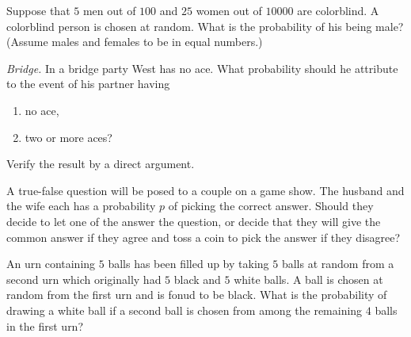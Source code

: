 \begin{problem}[Handout 4, \# 9]
  Suppose that \(5\) men out of \(100\) and \(25\) women out of
  \(\num{10000}\) are colorblind. A colorblind person is chosen at
  random. What is the probability of his being male? (Assume males and
  females to be in equal numbers.)
\end{problem}
\begin{solution}

\end{solution}
\newpage

\begin{problem}[Handout 4, \# 10]
  \emph{Bridge.} In a bridge party West has no ace. What probability should
  he attribute to the event of his partner having
  \begin{enumerate}[label=(\alph*),noitemsep]
  \item no ace,
  \item two or more aces?
  \end{enumerate}
  Verify the result by a direct argument.
\end{problem}
\begin{solution}

\end{solution}
\newpage

\begin{problem}[Handout 4, \# 12]
  A true-false question will be posed to a couple on a game show. The
  husband and the wife each has a probability \(p\) of picking the correct
  answer. Should they decide to let one of the answer the question, or
  decide that they will give the common answer if they agree and toss a
  coin to pick the answer if they disagree?
\end{problem}
\begin{solution}

\end{solution}
\newpage

\begin{problem}[Handout 4, \# 13]
  An urn containing \(5\) balls has been filled up by taking \(5\) balls at
  random from a second urn which originally had \(5\) black and \(5\) white
  balls. A ball is chosen at random from the first urn and is fonud to be
  black. What is the probability of drawing a white ball if a second ball
  is chosen from among the remaining \(4\) balls in the first urn?
\end{problem}
\begin{solution}

\end{solution}
\newpage

